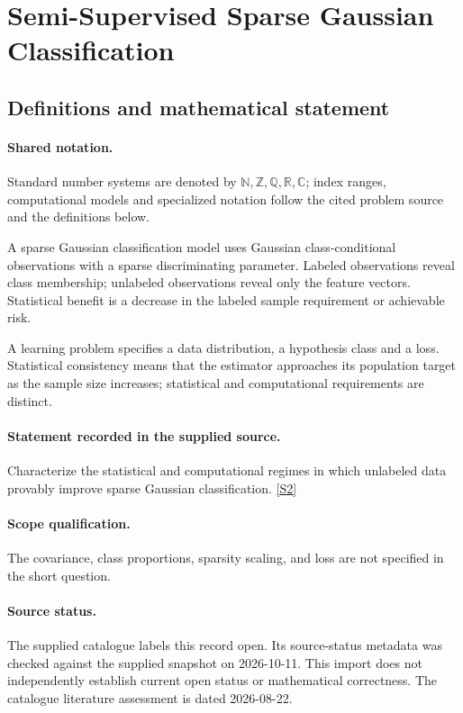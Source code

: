 \documentclass[11pt]{article}
\newcommand{\sref}[2]{\hyperlink{source:#1:#2}{[S#2]}}
\begin{document}
\section{Semi-Supervised Sparse Gaussian Classification}\label{statement}

\subsection{Definitions and mathematical statement}

\paragraph{Shared notation.}Standard number systems are denoted by $\mathbb N,\mathbb Z,\mathbb Q,\mathbb R,\mathbb C$; index ranges, computational models and specialized notation follow the cited problem source and the definitions below.


A sparse Gaussian classification model uses Gaussian class-conditional observations with a sparse discriminating parameter. Labeled observations reveal class membership; unlabeled observations reveal only the feature vectors. Statistical benefit is a decrease in the labeled sample requirement or achievable risk.

A learning problem specifies a data distribution, a hypothesis class and a loss. Statistical consistency means that the estimator approaches its population target as the sample size increases; statistical and computational requirements are distinct.
\paragraph{Statement recorded in the supplied source.}
Characterize the statistical and computational regimes in which unlabeled data provably improve sparse Gaussian classification. \sref{statement}{2}
\paragraph{Scope qualification.}
The covariance, class proportions, sparsity scaling, and loss are not specified in the short question.
\paragraph{Source status.}
The supplied catalogue labels this record open. Its source-status metadata was checked against the supplied snapshot on 2026-10-11. This import does not independently establish current open status or mathematical correctness. The catalogue literature assessment is dated 2026-08-22.
\end{document}
